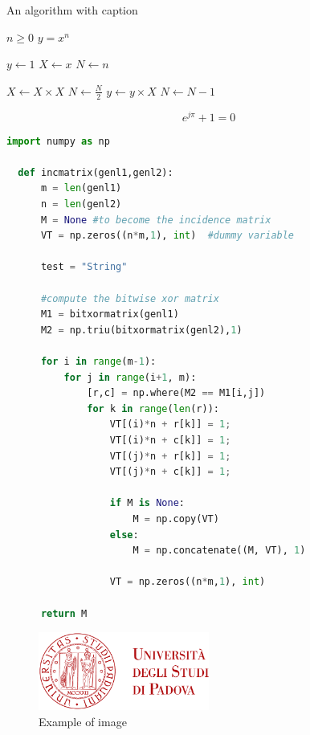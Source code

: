 \begin{algorithm}[ht]
    \caption{An algorithm with caption}\label{alg:two}
    \begin{algorithmic}
        \REQUIRE $n \geq 0$
        \ENSURE $y = x^n$
        
        \STATE $y \gets 1$
        \STATE $X \gets x$
        \STATE $N \gets n$
        
              \STATE $X \gets X \times X$
              \STATE $N \gets \frac{N}{2} $  
              \STATE $y \gets y \times X$
              \STATE $N \gets N - 1$
            \ENDIF
        \ENDWHILE
    \end{algorithmic}
\end{algorithm}

\begin{equation}
e^{j\pi} + 1 = 0
\end{equation}

\begin{lstlisting}[language=Python, caption=Code snippet example]
  import numpy as np
      
  def incmatrix(genl1,genl2):
      m = len(genl1)
      n = len(genl2)
      M = None #to become the incidence matrix
      VT = np.zeros((n*m,1), int)  #dummy variable
  
      test = "String"
      
      #compute the bitwise xor matrix
      M1 = bitxormatrix(genl1)
      M2 = np.triu(bitxormatrix(genl2),1) 
  
      for i in range(m-1):
          for j in range(i+1, m):
              [r,c] = np.where(M2 == M1[i,j])
              for k in range(len(r)):
                  VT[(i)*n + r[k]] = 1;
                  VT[(i)*n + c[k]] = 1;
                  VT[(j)*n + r[k]] = 1;
                  VT[(j)*n + c[k]] = 1;
                  
                  if M is None:
                      M = np.copy(VT)
                  else:
                      M = np.concatenate((M, VT), 1)
                  
                  VT = np.zeros((n*m,1), int)
      
      return M
  \end{lstlisting}

  
\begin{figure}[ht]
    \centering
    \includegraphics[width=0.5\textwidth]{res/ltunipd}
    \caption{Example of image}
\end{figure}